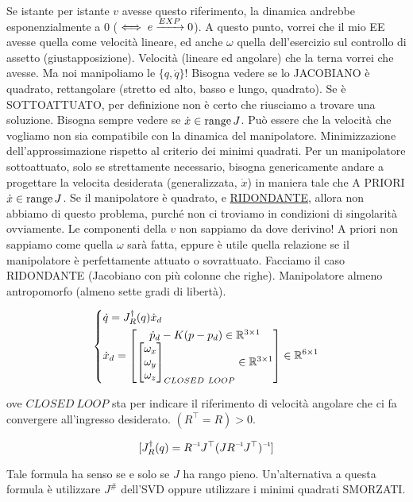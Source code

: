 Se istante per istante $v$ avesse questo riferimento, la dinamica andrebbe esponenzialmente a 0 ($\iff e\tendsto{EXP}0$). A questo punto, vorrei che il mio EE avesse quella come velocità lineare, ed anche $\omega$ quella dell'esercizio sul controllo di assetto (giustapposizione). Velocità (lineare ed angolare) che la terna vorrei che avesse. Ma noi manipoliamo le $\{q,\dot{q}\}$! Bisogna vedere se lo JACOBIANO è quadrato, rettangolare (stretto ed alto, basso e lungo, quadrato). Se è SOTTOATTUATO, per definizione non è certo che riusciamo a trovare una soluzione. Bisogna sempre vedere se $\dot{x}\in\operatorname{range}{J}$. Può essere che la velocità che vogliamo non sia compatibile con la dinamica del manipolatore. Minimizzazione dell'approssimazione rispetto al criterio dei minimi quadrati. Per un manipolatore sottoattuato, solo se strettamente necessario, bisogna genericamente andare a progettare la velocita desiderata (generalizzata, $\dot{x}$) in maniera tale che A PRIORI $\dot{x}\in\operatorname{range}{J}$. Se il manipolatore è quadrato, e \underline{RIDONDANTE}, allora non abbiamo di questo problema, purché non ci troviamo in condizioni di singolarità ovviamente. Le componenti della $v$ non sappiamo da dove derivino! A priori non sappiamo come quella $\omega$ sarà fatta, eppure è utile quella relazione se il manipolatore è perfettamente attuato o sovrattuato. Facciamo il caso RIDONDANTE (Jacobiano con più colonne che righe). Manipolatore almeno antropomorfo (almeno sette gradi di libertà). 

\[	
	\left\{
	\begin{aligned}
	&\dot{q}=J^\dag_R(q)\dot{x}_d\\
	&\dot{x}_d = \begin{bmatrix}\dot{p}_d-K(p-p_d)\in\R^{3\times 1}\\\begin{bmatrix}\omega_x\\\omega_y\\\omega_z\end{bmatrix}_{CLOSED\ LOOP}\in\R^{3\times 1}\end{bmatrix}\in\R^{6\times 1}
	\end{aligned}
	\right.
\]

ove $CLOSED\ LOOP$ sta per indicare il riferimento di velocità angolare che ci fa convergere all'ingresso desiderato. $(R^\top=R)>0$. 

\[
	[J^\dag_R(q) = \inv{R}J^\top\inv{(J\inv{R}J^\top)}]
\]

Tale formula ha senso se e solo se $J$ ha rango pieno. Un'alternativa a questa formula è utilizzare $J^\#$ dell'SVD oppure utilizzare i minimi quadrati SMORZATI.

